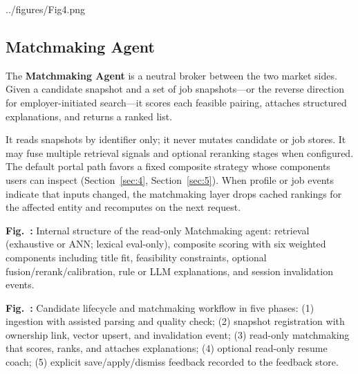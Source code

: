 \begin{JFigure}{../figures/Fig4.png}
\vspace{1\baselineskip}
\end{JFigure}

\subsection{Matchmaking Agent}\label{sec:3-matchmaking}

The \textbf{Matchmaking Agent} is a neutral broker between the two market sides.
Given a candidate snapshot and a set of job snapshots---or the reverse direction for employer-initiated search---it scores each feasible pairing, attaches structured explanations, and returns a ranked list.

It reads snapshots by identifier only; it never mutates candidate or job stores.
It may fuse multiple retrieval signals and optional reranking stages when configured.
The default portal path favors a fixed composite strategy whose components users can inspect (Section~\ref{sec:4}, Section~\ref{sec:5}).
When profile or job events indicate that inputs changed, the matchmaking layer drops cached rankings for the affected entity and recomputes on the next request.

\begin{center}
\label{fig:4}
\par\smallskip\noindent\textbf{Fig.~\thefigure:} Internal structure of the read-only Matchmaking agent: retrieval (exhaustive or ANN; lexical eval-only), composite scoring with six weighted components including title fit, feasibility constraints, optional fusion/rerank/calibration, rule or LLM explanations, and session invalidation events.
\end{center}

\begin{center}
\label{fig:5}
\par\smallskip\noindent\textbf{Fig.~\thefigure:} Candidate lifecycle and matchmaking workflow in five phases: (1) ingestion with assisted parsing and quality check; (2) snapshot registration with ownership link, vector upsert, and invalidation event; (3) read-only matchmaking that scores, ranks, and attaches explanations; (4) optional read-only resume coach; (5) explicit save/apply/dismiss feedback recorded to the feedback store.
\end{center}

